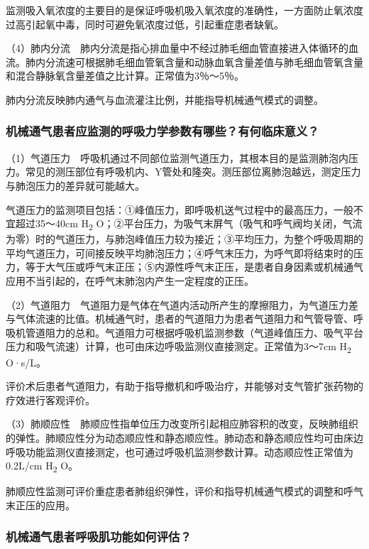 监测吸入氧浓度的主要目的是保证呼吸机吸入氧浓度的准确性，一方面防止氧浓度过高引起氧中毒，同时可避免氧浓度过低，引起重症患者缺氧。

（4）肺内分流　肺内分流是指心排血量中不经过肺毛细血管直接进入体循环的血流。肺内分流速可根据肺毛细血管氧含量和动脉血氧含量差值与肺毛细血管氧含量和混合静脉氧含量差值之比计算。正常值为3％～5％。

肺内分流反映肺内通气与血流灌注比例，并能指导机械通气模式的调整。

\subsubsection{机械通气患者应监测的呼吸力学参数有哪些？有何临床意义？}

（1）气道压力　呼吸机通过不同部位监测气道压力，其根本目的是监测肺泡内压力。常见的测压部位有呼吸机内、Y管处和隆突。测压部位离肺泡越远，测定压力与肺泡压力的差异就可能越大。

气道压力的监测项目包括：①峰值压力，即呼吸机送气过程中的最高压力，一般不宜超过35～40cm
H\textsubscript{2}
O；②平台压力，为吸气末屏气（吸气和呼气阀均关闭，气流为零）时的气道压力，与肺泡峰值压力较为接近；③平均压力，为整个呼吸周期的平均气道压力，可间接反映平均肺泡压力；④呼气末压力，为呼气即将结束时的压力，等于大气压或呼气末正压；⑤内源性呼气末正压，是患者自身因素或机械通气应用不当引起的，在呼气末肺泡内产生一定程度的正压。

（2）气道阻力　气道阻力是气体在气道内活动所产生的摩擦阻力，为气道压力差与气体流速的比值。机械通气时，患者的气道阻力为患者气道阻力和气管导管、呼吸机管道阻力的总和。气道阻力可根据呼吸机监测参数（气道峰值压力、吸气平台压力和吸气流速）计算，也可由床边呼吸监测仪直接测定。正常值为3～7cm
H\textsubscript{2} O·s/L。

评价术后患者气道阻力，有助于指导撤机和呼吸治疗，并能够对支气管扩张药物的疗效进行客观评价。

（3）肺顺应性　肺顺应性指单位压力改变所引起相应肺容积的改变，反映肺组织的弹性。肺顺应性分为动态顺应性和静态顺应性。肺动态和静态顺应性均可由床边呼吸功能监测仪直接测定，也可通过呼吸机监测参数计算。动态顺应性正常值为0.2L/cm
H\textsubscript{2} O。

肺顺应性监测可评价重症患者肺组织弹性，评价和指导机械通气模式的调整和呼气末正压的应用。

\subsubsection{机械通气患者呼吸肌功能如何评估？}

